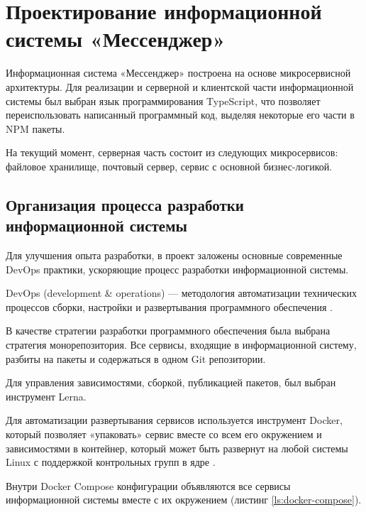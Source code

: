 \chapter{Проектирование информационной системы «Мессенджер»}

Информационная система «Мессенджер» построена на основе микросервисной архитектуры. Для реализации и серверной и клиентской части информационной системы был выбран язык программирования TypeScript, что позволяет переиспользовать написанный программный код, выделяя некоторые его части в NPM пакеты.

На текущий момент, серверная часть состоит из следующих микросервисов: файловое хранилище, почтовый сервер, сервис с основной бизнес-логикой.

\section{Организация процесса разработки информационной системы}

Для улучшения опыта разработки, в проект заложены основные современные DevOps практики, ускоряющие процесс разработки информационной системы.

DevOps (development \& operations) — методология автоматизации технических процессов сборки, настройки и развертывания программного обеспечения \cite{DevOps}.

В качестве стратегии разработки программного обеспечения была выбрана стратегия монорепозитория. Все сервисы, входящие в информационной систему, разбиты на пакеты и содержаться в одном Git репозитории.

Для управления зависимостями, сборкой, публикацией пакетов, был выбран инструмент Lerna.

Для автоматизации развертывания сервисов используется инструмент Docker, который позволяет «упаковать» сервис вместе со всем его окружением и зависимостями в контейнер, который может быть развернут на любой системы Linux с поддержкой контрольных групп в ядре \cite{Docker}.

Внутри Docker Compose конфигурации объявляются все сервисы информационной системы вместе с их окружением (листинг \ref{ls:docker-compose}).

